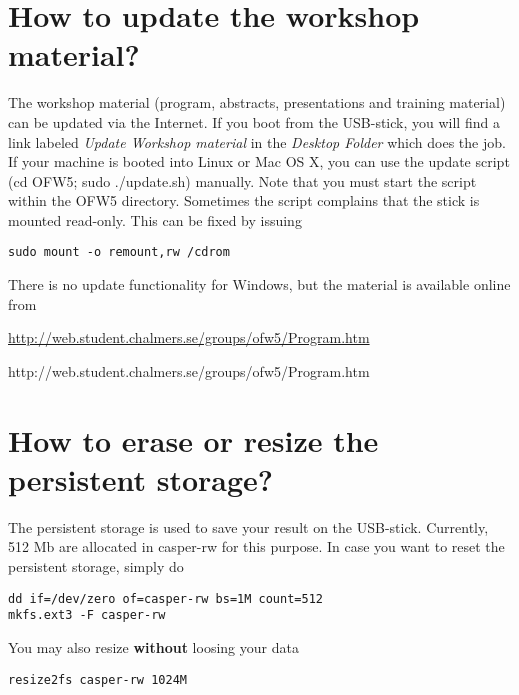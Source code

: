 \documentclass[11pt,a4paper,twocolumn]{article}
\begin{document}
\section{How to update the workshop material?}

The workshop material (program, abstracts, presentations and training material)
can be updated via the Internet. If you boot from the USB-stick, you will find a
link labeled \emph{Update Workshop material} in the \emph{Desktop Folder} which
does the job. If your machine is booted into Linux or Mac OS X, you can use the
update script (cd OFW5; sudo ./update.sh) manually. Note that you must start the
script within the OFW5 directory. Sometimes the script complains that the stick
is mounted read-only. This can be fixed by issuing

{\scriptsize
\begin{verbatim}
sudo mount -o remount,rw /cdrom
\end{verbatim}
}

There is no update functionality for Windows, but the material is available
online from
\begin{latexonly}
\href{http://web.student.chalmers.se/groups/ofw5/Program.htm}{http://web.student.chalmers.se/groups/ofw5/Program.htm}
\end{latexonly}
\begin{htmlonly}
 {http://web.student.chalmers.se/groups/ofw5/Program.htm}
\end{htmlonly}

\section{How to erase or resize the persistent storage?}

The persistent storage is used to save your result on the USB-stick. Currently,
512 Mb are allocated in casper-rw for this purpose. In case you want to reset
the persistent storage, simply do

{\scriptsize
\begin{verbatim}
dd if=/dev/zero of=casper-rw bs=1M count=512
mkfs.ext3 -F casper-rw
\end{verbatim}
}

You may also resize {\bf without} loosing your data

{\scriptsize
\begin{verbatim}
resize2fs casper-rw 1024M
\end{verbatim}
}

\end{document}
